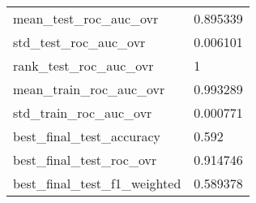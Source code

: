\begin{tabular}{ll}
mean\_test\_roc\_auc\_ovr       &                                           0.895339 \\
std\_test\_roc\_auc\_ovr        &                                           0.006101 \\
rank\_test\_roc\_auc\_ovr       &                                                  1 \\
mean\_train\_roc\_auc\_ovr      &                                           0.993289 \\
std\_train\_roc\_auc\_ovr       &                                           0.000771 \\
best\_final\_test\_accuracy    &                                              0.592 \\
best\_final\_test\_roc\_ovr     &                                           0.914746 \\
best\_final\_test\_f1\_weighted &                                           0.589378 \\
\bottomrule
\end{tabular}
